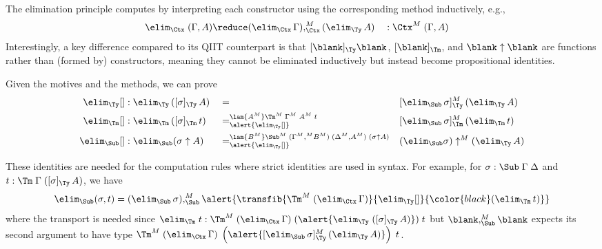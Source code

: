 \documentclass[a4paper,UKenglish,numberwithinsect,cleveref,thm-restate]{lipics-v2021}
\begin{document}
The elimination principle computes by interpreting each constructor using the corresponding method inductively, e.g.,
\begin{alignat*}{5}
  \elim_{\Ctx}\;(\Gamma, A) & \reduce (\elim_{\Ctx}\,\Gamma),_{\Ctx}^{M} (\elim_{\Ty}\,A) && : \Ctx^M\;(\Gamma, A) %
\end{alignat*}
%
Interestingly, a key difference compared to its QIIT counterpart is that $[\blank]_{\Ty}\blank$, $[\blank]_{\Tm}$, and $\blank\uparrow\blank$ are functions rather than (formed by) constructors, meaning they cannot be eliminated inductively but instead become propositional identities.
\begin{proposition}\label{prop:provable-function-clauses}
  Given the motives and the methods, we can prove
\begin{alignat*}{5}
  \elim_{\Ty}[] & : \elim_{\Ty}\,([\sigma]_{\Ty}\,A) && = && [\elim_{\Sub}\,\sigma]^M_{\Ty}\,(\elim_{\Ty}\,A) \\
  \elim_{\Tm}[] & : \elim_{\Tm}\,([\sigma]_{\Tm}\,t) && =^{\lam{A^M}\Tm^M\;\Gamma^M\;A^M\;t}_{\alert{\elim_{\Ty}[]}} && [\elim_{\Sub}\,\sigma]^M_{\Tm}\,(\elim_{\Tm}\,t) \\
  \elim_{\Sub}[] & : \elim_{\Sub}(\sigma\uparrow A) && =^{\lam{B^M}\Sub^M\;(\Gamma^M,^M B^M)\;(\Delta^M, A^M)\;(\sigma \uparrow A)}_{\alert{\elim_{\Ty}[]}} && (\elim_{\Sub} \sigma) \uparrow^M (\elim_{\Ty}\,A) 
\end{alignat*}
\end{proposition}

These identities are needed for the computation rules where strict identities are used in syntax.
For example, for $\sigma : \Sub\;\Gamma\;\Delta$ and $t : \Tm\;\Gamma\;([\sigma]_{\Ty}\,A)$, we have 
\[
  \elim_{\Sub}(\sigma, t) = (\elim_{\Sub}\,\sigma) ,_{\Sub}^M \alert{\transfib{\Tm^M\;(\elim_{\Ctx}\,\Gamma)}{\elim_{\Ty}[]}{\color{black}(\elim_{\Tm}\,t)}}
\]
where the transport is needed since $\elim_{\Tm}\;t : \Tm^M\;(\elim_{\Ctx}\,\Gamma)\;(\alert{\elim_{\Ty}\;([\sigma]_{\Ty}\,A)})\;t$ but $\blank ,_{\Sub}^M \blank$ expects its second argument to have type $\Tm^M\;(\elim_{\Ctx}\,\Gamma)\;\left(\alert{[\elim_{\Sub}\,\sigma]^M_{\Ty}\,(\elim_{\Ty}\,A)}\right)\;t$.
\end{document}
